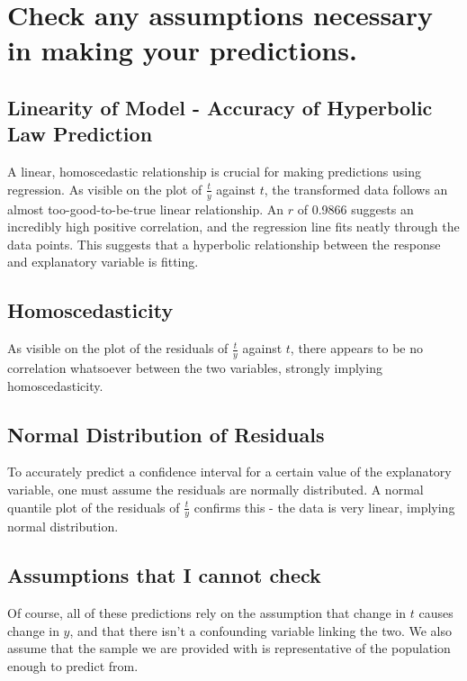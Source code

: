 \documentclass[]{article}
\begin{document}
\section{Check any assumptions necessary in making your predictions.}

\subsection{Linearity of Model - Accuracy of Hyperbolic Law Prediction}
A linear, homoscedastic relationship is crucial for making predictions using regression. As visible on the plot of $\frac{t}{y}$ against $t$, the transformed data follows an almost too-good-to-be-true linear relationship. An $r$ of 0.9866 suggests an incredibly high positive correlation, and the regression line fits neatly through the data points. This suggests that a hyperbolic relationship between the response and explanatory variable is fitting.

\subsection{Homoscedasticity}
As visible on the plot of the residuals of $\frac{t}{y}$ against $t$, there appears to be no correlation whatsoever between the two variables, strongly implying homoscedasticity.

\subsection{Normal Distribution of Residuals}
To accurately predict a confidence interval for a certain value of the explanatory variable, one must assume the residuals are normally distributed. A normal quantile plot of the residuals of $\frac{t}{y}$ confirms this - the data is very linear, implying normal distribution.

\subsection{Assumptions that I cannot check}
Of course, all of these predictions rely on the assumption that change in $t$ causes change in $y$, and that there isn't a confounding variable linking the two. We also assume that the sample we are provided with is representative of the population enough  to predict from.
\end{document}
